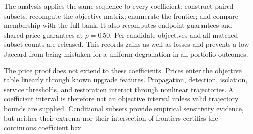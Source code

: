The analysis applies the same sequence to every coefficient: construct paired
subsets; recompute the objective matrix; enumerate the frontier; and compare
membership with the full bank. It also recomputes endpoint guarantees and
shared-price guarantees at $\rho=0.50$. Per-candidate objectives and all
matched-subset counts are released. This records gains as well as losses
and prevents a low Jaccard from being mistaken for a uniform degradation
in all portfolio outcomes.

The price proof does not extend to these coefficients. Prices enter the
objective table linearly through known upgrade features. Propagation,
detection, isolation, service thresholds, and restoration interact through
nonlinear trajectories. A coefficient interval is therefore not an objective
interval unless valid trajectory bounds are supplied. Conditional subsets
provide empirical sensitivity evidence, but neither their extrema nor their
intersection of frontiers certifies the continuous coefficient box.

